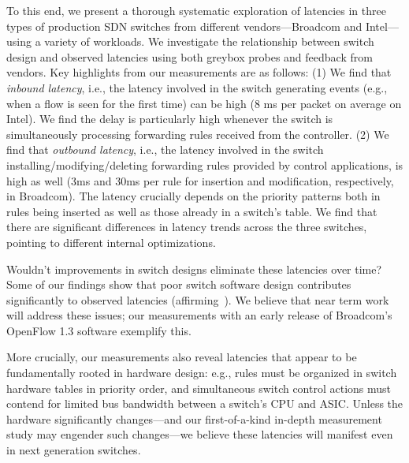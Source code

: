 
To this end, we present a thorough systematic exploration of latencies in 
three types of production SDN switches from
\numVendors different vendors---Broadcom and Intel---using a variety
of workloads. We investigate the relationship between switch design
and observed latencies using both greybox probes and feedback from
vendors. Key highlights from our measurements are as follows: (1) We
find that {\em inbound latency}, i.e., the latency involved in the
switch generating events (e.g., when a flow is seen for the first
time) can be high (8 ms per packet on average on Intel). We find the
delay is particularly high whenever the switch is simultaneously
processing forwarding rules received from the controller. (2) We find
that {\em outbound latency}, i.e., the latency involved in the switch
installing/modifying/deleting forwarding rules provided by control
applications, is high as well (3ms and 30ms per rule for insertion and
modification, respectively, in Broadcom). The latency crucially
depends on the priority patterns both in rules being inserted as well as
those already in a switch's table. We find that there are significant
differences in latency trends across the three switches, pointing to
different internal optimizations.


Wouldn't improvements in switch designs eliminate these latencies over
time? Some of our findings show that poor switch software design
contributes significantly to observed latencies
(affirming~\cite{ucsdpaper,oflops}). We believe that near term work
will address these issues; our measurements with an early release of
Broadcom's OpenFlow 1.3 software exemplify this.

More crucially, our measurements also reveal latencies that appear to
be fundamentally rooted in hardware design: e.g., rules must be
organized in switch hardware tables in priority order, and
simultaneous switch control actions must contend for limited bus
bandwidth between a switch's CPU and ASIC. Unless the hardware
significantly changes---and our first-of-a-kind in-depth measurement
study may engender such changes---we believe these latencies will
manifest even in next generation switches.

